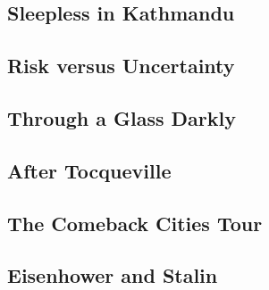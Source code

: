 \documentclass[a4paper, twocolumn]{article}
\begin{document}
\subsection{Sleepless in Kathmandu}


\subsection{Risk versus Uncertainty}


\subsection{Through a Glass Darkly}


\subsection{After Tocqueville}


\subsection{The Comeback Cities Tour}


\subsection{Eisenhower and Stalin}


\onecolumn{
{}

}
\end{document}
